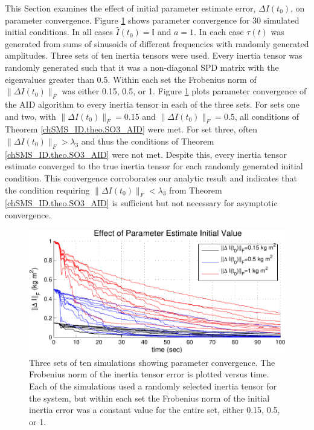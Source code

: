 This Section examines the effect of initial parameter estimate error,
$\Delta I(t_0)$, on parameter convergence. Figure
\ref{chSMS_ID.fig.SO3_AID_smallRange} shows parameter convergence for
30 simulated initial conditions. In all cases
$\hat{I}(t_0)=\mathbb{I}$ and $a=1$. In each case $\tau(t)$ was generated
from sums of sinusoids of different frequencies with randomly
generated amplitudes.  Three sets of ten inertia tensors were used.
Every inertia tensor was randomly generated such that it was a
non-diagonal \ac{SPD} matrix with the eigenvalues greater than
0.5. Within each set the Frobenius norm of $\|\Delta I(t_0)\|_F$ was
either 0.15, 0.5, or 1. Figure \ref{chSMS_ID.fig.SO3_AID_smallRange}
plots parameter convergence of the \ac{AID} algorithm to every
inertia tensor in each of the three sets. For sets one and two, with
$\|\Delta I(t_0)\|_F=0.15$ and $\|\Delta I(t_0)\|_F=0.5$, all
conditions of Theorem \ref{chSMS_ID.theo.SO3_AID} were met. For set
three, often $\|\Delta I(t_0)\|_F>\lambda_3$ and thus the conditions
of Theorem \ref{chSMS_ID.theo.SO3_AID} were not met.  Despite this,
every inertia tensor estimate converged to the true inertia tensor for
each randomly generated initial condition. This convergence
corroborates our analytic result and indicates that the condition
requiring $\|\Delta I(t_0)\|_F<\lambda_3$ from Theorem
\ref{chSMS_ID.theo.SO3_AID} is sufficient but not necessary for
asymptotic convergence.


\begin{center}
\begin{figure}[htbp]
  \begin{center}
    \includegraphics[width=150mm]{./chSMS_ID/images/inertiaEstimateInitErr}
  \end{center}
  \caption{ Three sets of ten simulations showing parameter
    convergence.  The Frobenius norm of the inertia tensor error is
    plotted versus time. Each of the simulations used a randomly
    selected inertia tensor for the system, but within each set the
    Frobenius norm of the initial inertia error was a constant value
    for the entire set, either 0.15, 0.5, or 1.}
  \label{chSMS_ID.fig.SO3_AID_smallRange}
\end{figure}
\end{center}


